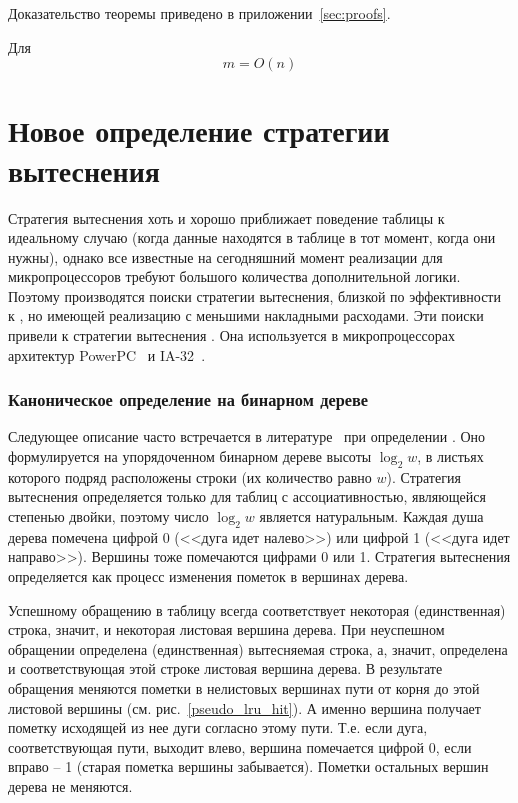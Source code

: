 \begin{theorem}\label{thm_mirror_lenth_lru} \UpperBoundLRUMirror
\end{theorem}
Доказательство теоремы приведено в приложении~\ref{sec:proofs}.
\begin{sld} Для \LRU
      $$m = O(n)$$
\end{sld}



\section{Новое определение стратегии вытеснения\\ \PseudoLRU}\label{sec:plru_new_definition}

Стратегия вытеснения \LRU хоть и хорошо приближает поведение
таблицы к идеальному случаю (когда данные находятся в
таблице в тот момент, когда они нужны), однако все известные на
сегодняшний момент реализации \LRU для микропроцессоров требуют большого
количества дополнительной логики. Поэтому производятся поиски
стратегии вытеснения, близкой по эффективности к \LRU, но имеющей
реализацию с меньшими накладными расходами. Эти поиски привели к
стратегии вытеснения \PseudoLRU. Она используется в микропроцессорах архитектур
PowerPC~\cite{PowerPC} и IA-32~\cite{FundamentalOfComputerOrganizationAndDesign}.

\subsubsection{Каноническое определение \PseudoLRU на бинарном дереве}

Следующее описание часто встречается в
литературе~\cite{FundamentalOfComputerOrganizationAndDesign} при
определении \PseudoLRU. Оно формулируется на
упорядоченном бинарном дереве высоты $\log_2 w$, в листьях которого
подряд расположены строки (их количество равно $w$). Стратегия вытеснения
\PseudoLRU определяется только для таблиц с ассоциативностью, являющейся степенью двойки, поэтому число $\log_2 w$ является натуральным. Каждая душа дерева помечена цифрой 0 (<<дуга идет налево>>) или цифрой 1 (<<дуга идет направо>>). Вершины тоже помечаются цифрами 0 или 1. Стратегия вытеснения определяется как процесс изменения пометок в вершинах дерева.

Успешному обращению в таблицу всегда соответствует некоторая (единственная) строка, значит, и некоторая листовая вершина дерева. При неуспешном обращении определена (единственная) вытесняемая строка, а, значит, определена и соответствующая этой строке листовая вершина дерева. В результате обращения меняются пометки в нелистовых вершинах пути от корня до этой листовой вершины (см. рис.~\ref{pseudo_lru_hit}). А именно вершина получает пометку
исходящей из нее дуги согласно этому пути. Т.е. если дуга, соответствующая пути, выходит влево, вершина помечается цифрой 0, если вправо -- 1 (старая пометка вершины забывается). Пометки остальных вершин дерева не меняются.

